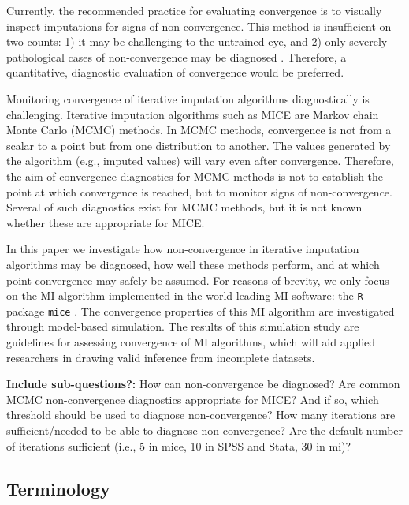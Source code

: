 \documentclass[Royal,times,sageh]{sagej}
\begin{document}
Currently, the recommended practice for evaluating convergence is to
visually inspect imputations for signs of non-convergence. This method
is insufficient on two counts: 1) it may be challenging to the untrained
eye, and 2) only severely pathological cases of non-convergence may be
diagnosed \citep[\(\S\) 6.5.2]{buur18}. Therefore, a quantitative,
diagnostic evaluation of convergence would be preferred.

Monitoring convergence of iterative imputation algorithms diagnostically
is challenging. Iterative imputation algorithms such as MICE are Markov
chain Monte Carlo (MCMC) methods. In MCMC methods, convergence is not
from a scalar to a point but from one distribution to another. The
values generated by the algorithm (e.g., imputed values) will vary even
after convergence. Therefore, the aim of convergence diagnostics for
MCMC methods is not to establish the point at which convergence is
reached, but to monitor signs of non-convergence. Several of such
diagnostics exist for MCMC methods, but it is not known whether these
are appropriate for MICE.

In this paper we investigate how non-convergence in iterative imputation
algorithms may be diagnosed, how well these methods perform, and at
which point convergence may safely be assumed. For reasons of brevity,
we only focus on the MI algorithm implemented in the world-leading MI
software: the \texttt{R} \citep{R} package \texttt{mice} \citep{mice}.
The convergence properties of this MI algorithm are investigated through
model-based simulation. The results of this simulation study are
guidelines for assessing convergence of MI algorithms, which will aid
applied researchers in drawing valid inference from incomplete datasets.

\textbf{Include sub-questions?:} How can non-convergence be diagnosed?
Are common MCMC non-convergence diagnostics appropriate for MICE? And if
so, which threshold should be used to diagnose non-convergence? How many
iterations are sufficient/needed to be able to diagnose non-convergence?
Are the default number of iterations sufficient (i.e., 5 in mice, 10 in
SPSS and Stata, 30 in mi)?

\hypertarget{terminology}{%
\subsection{Terminology}\label{terminology}}
\end{document}
